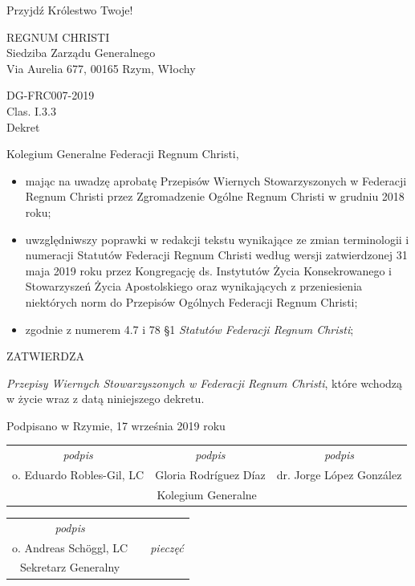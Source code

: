 \begin{framed}
	\begin{footnotesize}
		\begin{center}
			Przyjdź Królestwo Twoje!
			
			REGNUM CHRISTI\\
			Siedziba Zarządu Generalnego\\
			Via Aurelia 677, 00165 Rzym, Włochy 
		\end{center}
		
		DG-FRC007-2019\\
		Clas. I.3.3\\
		Dekret
		
		Kolegium Generalne Federacji Regnum Christi,
		\begin{itemize}
			
			\item mając na uwadzę aprobatę Przepisów Wiernych Stowarzyszonych w Federacji Regnum Christi przez Zgromadzenie Ogólne Regnum Christi w grudniu 2018 roku; 
			
			\item uwzględniwszy poprawki w redakcji tekstu wynikające ze zmian terminologii i numeracji Statutów Federacji Regnum Christi według wersji zatwierdzonej 31 maja 2019 roku przez Kongregację ds. Instytutów Życia Konsekrowanego i Stowarzyszeń Życia Apostolskiego oraz wynikających z przeniesienia niektórych norm do Przepisów Ogólnych Federacji Regnum Christi;
			
			\item zgodnie z numerem 4.7 i 78 \S{}1 {\em Statutów Federacji Regnum Christi};
		\end{itemize}
		\begin{center}
			ZATWIERDZA 
		\end{center}
		
		{\em Przepisy Wiernych Stowarzyszonych w Federacji Regnum Christi}, które wchodzą w życie wraz z datą niniejszego dekretu.
		\begin{center}
			Podpisano w Rzymie, 17 września 2019 roku
			\begin{tabular}
				{ c c c } {\em podpis} & {\em podpis} & {\em podpis} \\
				o. Eduardo Robles-Gil, LC & Gloria Rodríguez Díaz & dr. Jorge López González \\
				\multicolumn{3}{c}{Kolegium Generalne} 
			\end{tabular}
			\begin{tabular}
				{ c c c } {\em podpis} & & \\
				o. Andreas Schöggl, LC & & {\em pieczęć} \\
				Sekretarz Generalny & & 
			\end{tabular}
		\end{center}
	\end{footnotesize}
\end{framed}

